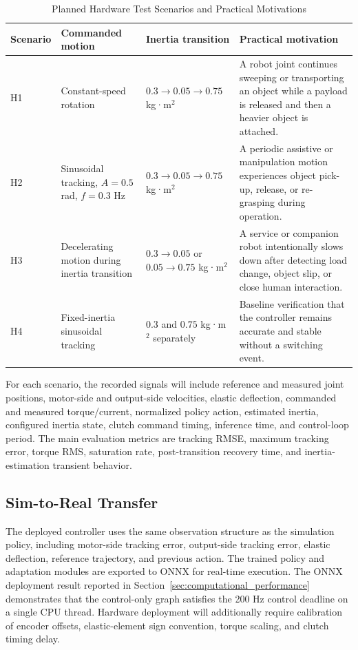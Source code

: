 \documentclass[lettersize,journal]{IEEEtran}
\begin{document}
\begin{table}[t]
\centering
\caption{Planned Hardware Test Scenarios and Practical Motivations}
\label{tab:hardware_scenarios}
\footnotesize
\begin{tabular}{@{}p{}p{}p{}p{}@{}}
\toprule
Scenario & Commanded motion & Inertia transition & Practical motivation \\
\midrule
H1 & Constant-speed rotation & $0.3 \rightarrow 0.05 \rightarrow 0.75$ kg·m$^2$ & A robot joint continues sweeping or transporting an object while a payload is released and then a heavier object is attached. \\
H2 & Sinusoidal tracking, $A=0.5$ rad, $f=0.3$ Hz & $0.3 \rightarrow 0.05 \rightarrow 0.75$ kg·m$^2$ & A periodic assistive or manipulation motion experiences object pick-up, release, or re-grasping during operation. \\
H3 & Decelerating motion during inertia transition & $0.3 \rightarrow 0.05$ or $0.05 \rightarrow 0.75$ kg·m$^2$ & A service or companion robot intentionally slows down after detecting load change, object slip, or close human interaction. \\
H4 & Fixed-inertia sinusoidal tracking & $0.3$ and $0.75$ kg·m$^2$ separately & Baseline verification that the controller remains accurate and stable without a switching event. \\
\bottomrule
\end{tabular}
\end{table}

For each scenario, the recorded signals will include reference and measured joint positions, motor-side and output-side velocities, elastic deflection, commanded and measured torque/current, normalized policy action, estimated inertia, configured inertia state, clutch command timing, inference time, and control-loop period. The main evaluation metrics are tracking RMSE, maximum tracking error, torque RMS, saturation rate, post-transition recovery time, and inertia-estimation transient behavior.

\subsection{Sim-to-Real Transfer}

The deployed controller uses the same observation structure as the simulation policy, including motor-side tracking error, output-side tracking error, elastic deflection, reference trajectory, and previous action. The trained policy and adaptation modules are exported to ONNX for real-time execution. The ONNX deployment result reported in Section~\ref{sec:computational_performance} demonstrates that the control-only graph satisfies the 200 Hz control deadline on a single CPU thread. Hardware deployment will additionally require calibration of encoder offsets, elastic-element sign convention, torque scaling, and clutch timing delay.
\end{document}

